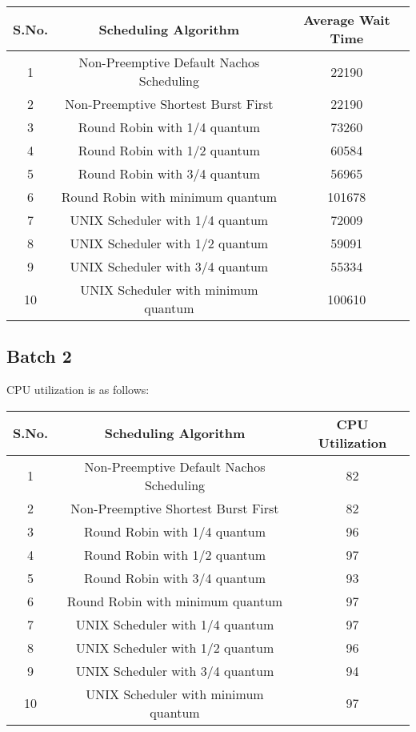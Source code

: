 \documentclass[]{article}
\begin{document}
\begin{center}
\begin{tabular}{|c|c|c|}
\hline
S.No. & Scheduling Algorithm & Average Wait Time\\
\hline
1 & Non-Preemptive Default Nachos Scheduling & 22190\\
2 & Non-Preemptive Shortest Burst First & 22190\\
3 & Round Robin with 1/4 quantum & 73260\\
4 & Round Robin with 1/2 quantum & 60584\\
5 & Round Robin with 3/4 quantum & 56965\\
6 & Round Robin with minimum quantum & 101678\\
7 & UNIX Scheduler with 1/4 quantum & 72009\\
8 & UNIX Scheduler with 1/2 quantum & 59091\\
9 & UNIX Scheduler with 3/4 quantum & 55334\\
10 & UNIX Scheduler with minimum quantum & 100610\\
\hline
\end{tabular}
\end{center}


\subsection{Batch 2}

CPU utilization is as follows:

\begin{center}
\begin{tabular}{|c|c|c|}
\hline
S.No. & Scheduling Algorithm & CPU Utilization\\
\hline
1 & Non-Preemptive Default Nachos Scheduling & 82\\
2 & Non-Preemptive Shortest Burst First & 82\\
3 & Round Robin with 1/4 quantum & 96\\
4 & Round Robin with 1/2 quantum & 97\\
5 & Round Robin with 3/4 quantum & 93\\
6 & Round Robin with minimum quantum & 97\\
7 & UNIX Scheduler with 1/4 quantum & 97\\
8 & UNIX Scheduler with 1/2 quantum & 96\\
9 & UNIX Scheduler with 3/4 quantum & 94\\
10 & UNIX Scheduler with minimum quantum & 97\\
\hline
\end{tabular}
\end{center}
\end{document}
